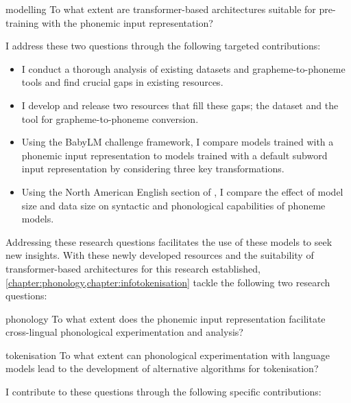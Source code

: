 \begin{question}{}{modelling}
    To what extent are transformer-based architectures suitable for pre-training with the phonemic input representation?
\end{question}

I address these two questions through the following targeted contributions:

\begin{itemize}
    \item I conduct a thorough analysis of existing datasets and grapheme-to-phoneme tools and find crucial gaps in existing resources.
    \item I develop and release two resources that fill these gaps; the \ipachildes dataset and the \gpp tool for grapheme-to-phoneme conversion.
    \item Using the BabyLM challenge framework, I compare models trained with a phonemic input representation to models trained with a default subword input representation by considering three key transformations.
    \item Using the North American English section of \ipachildes, I compare the effect of model size and data size on syntactic and phonological capabilities of phoneme models. 
\end{itemize}

Addressing these research questions facilitates the use of these models to seek new insights. With these newly developed resources and the suitability of transformer-based architectures for this research established, \cref{chapter:phonology,chapter:infotokenisation} tackle the following two research questions:

\begin{question}{}{phonology}
    To what extent does the phonemic input representation facilitate cross-lingual phonological experimentation and analysis?
\end{question}

\begin{question}{}{tokenisation}
    To what extent can phonological experimentation with language models lead to the development of alternative algorithms for tokenisation? 
\end{question}

I contribute to these questions through the following specific contributions:

